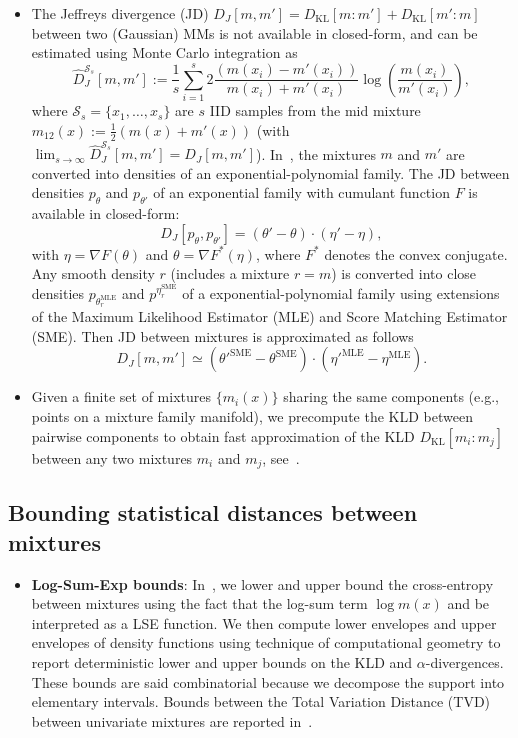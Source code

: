 \documentclass[11pt]{article}
\def\KL{\mathrm{KL}}
\def\calS{\mathcal{S}}
\def\KL{\mathrm{KL}}
\def\SME{\mathrm{SME}}
\def\MLE{\mathrm{MLE}}
\begin{document}
\begin{itemize}
	\item The Jeffreys divergence (JD) $D_J[m,m']=D_\KL[m:m']+D_\KL[m':m]$ between two (Gaussian) MMs is not available in closed-form, and can be estimated using Monte Carlo integration as 
	$$
\hat{D}_J^{\calS_s}[m,m'] :=   \frac{1}{s} \sum_{i=1}^s 2\frac{(m(x_i)-m'(x_i))}{m(x_i)+m'(x_i)}\log\left(\frac{m(x_i)}{m'(x_i)}\right),
$$
where $\calS_s=\{x_1,\ldots, x_s\}$ are $s$ IID samples from the mid mixture $m_{12}(x):=\frac{1}{2}(m(x)+m'(x))$ (with $\lim_{s\rightarrow \infty} \hat{D}_J^{\calS_s}[m,m']=D_J[m,m']$).
 In~\cite{JeffreysGMMPEF-2021}, the mixtures $m$ and $m'$ are converted into densities of an exponential-polynomial family.
The JD between densities $p_\theta$ and $p_{\theta'}$ of an exponential family with cumulant function $F$ is available in closed-form:
$$
D_J[p_\theta,p_{\theta'}]=(\theta'-\theta)\cdot (\eta'-\eta),
$$ 
with $\eta=\nabla F(\theta)$ and $\theta=\nabla F^*(\eta)$, where $F^*$ denotes the convex conjugate.
Any smooth density $r$ (includes a mixture $r=m$) is converted into  close densities $p_{\theta_r^\MLE}$ and $p^{\eta_r^\SME}$ of a exponential-polynomial family using
extensions of the Maximum Likelihood Estimator (MLE) and Score Matching Estimator (SME).
Then JD between mixtures is approximated as follows
$$
D_J[m,m']\simeq ({\theta'}^\SME-\theta^\SME)\cdot ({\eta'}^\MLE-\eta^\MLE).
$$

\item Given a finite set of mixtures $\{m_i(x)\}$ sharing the same components (e.g., points on a mixture family manifold), we precompute the KLD between  pairwise components to obtain fast approximation of the KLD $D_\KL[m_i:m_j]$ between any two mixtures $m_i$ and $m_j$, see~\cite{Comix-2016}.
 
\end{itemize}





\subsection{Bounding statistical distances between mixtures}\label{sec:mix:bound}

\begin{itemize}

\item {\bf Log-Sum-Exp bounds}: In~\cite{LSE-MM1D-2016,alphadiv-2017}, we lower and upper bound the cross-entropy between mixtures using the fact that the log-sum term $\log m(x)$ and be interpreted as a LSE function. We then compute lower envelopes and upper envelopes of density functions using technique of computational geometry to report deterministic lower and upper bounds on the KLD and $\alpha$-divergences. These bounds are said combinatorial because we decompose the support into elementary intervals. Bounds between the Total Variation Distance (TVD) between univariate mixtures are reported in~\cite{TVmixture-2018}.



\end{itemize}
\end{document}
